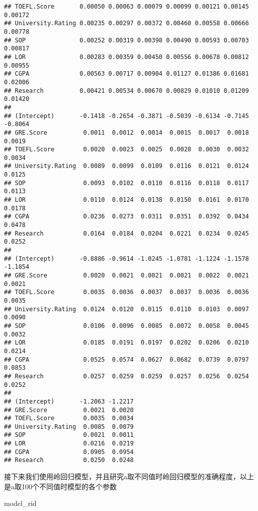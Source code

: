 \documentclass[
]{article}
\newenvironment{Shaded}{\begin{snugshade}}{\end{snugshade}}
\newcommand{\NormalTok}[1]{#1}
\begin{document}
\begin{verbatim}
## TOEFL.Score       0.00050 0.00063 0.00079 0.00099 0.00121 0.00145  0.00172
## University.Rating 0.00235 0.00297 0.00372 0.00460 0.00558 0.00666  0.00778
## SOP               0.00252 0.00319 0.00398 0.00490 0.00593 0.00703  0.00817
## LOR               0.00283 0.00359 0.00450 0.00556 0.00678 0.00812  0.00955
## CGPA              0.00563 0.00717 0.00904 0.01127 0.01386 0.01681  0.02006
## Research          0.00421 0.00534 0.00670 0.00829 0.01010 0.01209  0.01420
##                                                                          
## (Intercept)       -0.1418 -0.2654 -0.3871 -0.5039 -0.6134 -0.7145 -0.8064
## GRE.Score          0.0011  0.0012  0.0014  0.0015  0.0017  0.0018  0.0019
## TOEFL.Score        0.0020  0.0023  0.0025  0.0028  0.0030  0.0032  0.0034
## University.Rating  0.0089  0.0099  0.0109  0.0116  0.0121  0.0124  0.0125
## SOP                0.0093  0.0102  0.0110  0.0116  0.0118  0.0117  0.0113
## LOR                0.0110  0.0124  0.0138  0.0150  0.0161  0.0170  0.0178
## CGPA               0.0236  0.0273  0.0311  0.0351  0.0392  0.0434  0.0478
## Research           0.0164  0.0184  0.0204  0.0221  0.0234  0.0245  0.0252
##                                                                          
## (Intercept)       -0.8886 -0.9614 -1.0245 -1.0781 -1.1224 -1.1578 -1.1854
## GRE.Score          0.0020  0.0021  0.0021  0.0021  0.0022  0.0021  0.0021
## TOEFL.Score        0.0035  0.0036  0.0037  0.0037  0.0036  0.0036  0.0035
## University.Rating  0.0124  0.0120  0.0115  0.0110  0.0103  0.0097  0.0090
## SOP                0.0106  0.0096  0.0085  0.0072  0.0058  0.0045  0.0032
## LOR                0.0185  0.0191  0.0197  0.0202  0.0206  0.0210  0.0214
## CGPA               0.0525  0.0574  0.0627  0.0682  0.0739  0.0797  0.0853
## Research           0.0257  0.0259  0.0259  0.0257  0.0256  0.0254  0.0252
##                                  
## (Intercept)       -1.2063 -1.2217
## GRE.Score          0.0021  0.0020
## TOEFL.Score        0.0035  0.0034
## University.Rating  0.0085  0.0079
## SOP                0.0021  0.0011
## LOR                0.0216  0.0219
## CGPA               0.0905  0.0954
## Research           0.0250  0.0248
\end{verbatim}

接下来我们使用岭回归模型，并且研究a取不同值时岭回归模型的准确程度，以上是a取100个不同值时模型的各个参数

\begin{Shaded}
\begin{Highlighting}[]
\NormalTok{model\_rid}
\end{Highlighting}
\end{Shaded}
\end{document}
